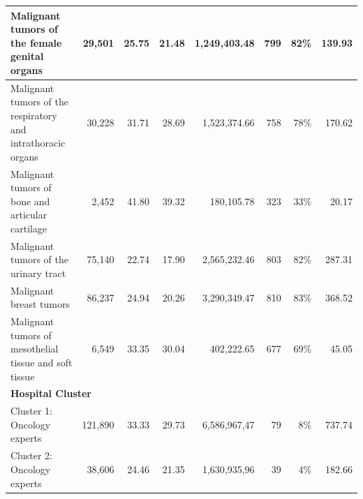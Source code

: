 \begin{table}[h]
{\begin{tabular}{|l|r|r|r|r|r|r|r|}
            Malignant tumors of the female genital organs                                    & 29,501           & 25.75                    & 21.48                    & 1,249,403.48            & 799                  & 82\%                  & 139.93                      \\ \hline
            Malignant tumors of the respiratory and intrathoracic organs                     & 30,228           & 31.71                    & 28.69                    & 1,523,374.66            & 758                  & 78\%                  & 170.62                      \\ \hline
            Malignant tumors of bone and articular cartilage                                 & 2,452            & 41.80                    & 39.32                    & 180,105.78              & 323                  & 33\%                  & 20.17                       \\ \hline
            Malignant tumors of the urinary tract                                            & 75,140           & 22.74                    & 17.90                    & 2,565,232.46            & 803                  & 82\%                  & 287.31                      \\ \hline
            Malignant breast tumors                                                          & 86,237           & 24.94                    & 20.26                    & 3,290,349.47            & 810                  & 83\%                  & 368.52                      \\ \hline
            Malignant tumors of mesothelial tissue and soft tissue                           & 6,549            & 33.35                    & 30.04                    & 402,222.65              & 677                  & 69\%                  & 45.05                       \\ \hline
            \multicolumn{8}{|l|}{\textbf{Hospital Cluster}}                                                                                                                                                                                                                  \\ \hline
            Cluster 1: Oncology experts                                                      & 121,890          & 33.33                    & 29.73                    & 6,586,967,47            & 79                   & 8\%                   & 737.74                      \\ \hline
            Cluster 2: Oncology experts                                                      & 38,606           & 24.46                    & 21.35                    & 1,630,935,96            & 39                   & 4\%                   & 182.66                      \\ \hline

\end{tabular}}
\end{table}
